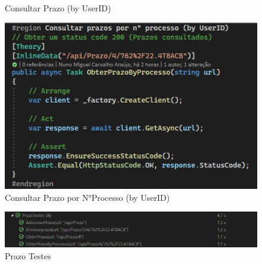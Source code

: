 \begin{figure}[!htbp]
\begin{minipage}[b]{0.4\textwidth}
    \caption{Consultar Prazo (by UserID)}
    \label{d.unitario}
  \end{minipage}
  \hfill
  \begin{minipage}[b]{0.4\textwidth}
    \includegraphics[width=\textwidth]{Figuras/TestesUnitarios/Prazo/Consultar Prazos por numero processo.png}
    \caption{Consultar Prazo por N°Processo (by UserID)}
    \label{d.unitario}
  \end{minipage}
\end{figure}

\begin{figure}[!h]
\centering
\includegraphics[width=1\textwidth]{Figuras/Testes/PrazoTestes.png}
\caption{Prazo Testes}
\label{d.teste}
\end{figure}


